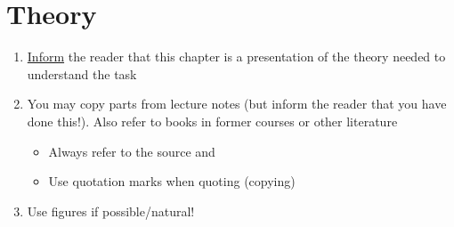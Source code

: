 \section{Theory}\label{sec:theory}
\begin{enumerate}[i]
	\item \underline{Inform} the reader that this chapter is a presentation of the theory needed to understand the task
	\item You may copy parts from lecture notes (but inform
	the reader that you have done this!). Also refer to
	books in former courses or other literature
	\begin{itemize}
		\item Always refer to the source and
		\item Use quotation marks when quoting (copying) 
	\end{itemize}
	\item Use figures if possible/natural!
\end{enumerate}